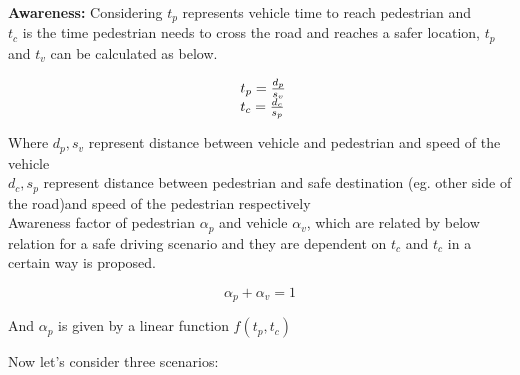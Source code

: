 
\newpara
\textbf{Awareness:}
Considering ${t_p}$ represents vehicle time to reach pedestrian and \\
${t_c}$ is the time pedestrian needs to cross the road and reaches a safer location,
${t_p}$ and ${t_v}$  can be calculated as below.

\begin{equation}
\begin{array}{l@{}}
  t_p = \frac{d_p}{s_v} \\
	t_c = \frac{d_c}{s_p}
\end{array}
\end{equation}

Where ${d_p},{s_v}$ represent distance between vehicle and pedestrian and speed of the vehicle\\
${d_c}, {s_p}$ represent distance between pedestrian and safe destination (eg. other side of the road)and speed of the pedestrian respectively \\
Awareness factor of pedestrian ${\alpha_p}$ and vehicle ${\alpha_v}$, 
which are related by below relation for a safe driving scenario and they are dependent on ${t_c}$ and ${t_c}$ in a certain way is proposed.

\comment
{
}
\begin{equation} \label{awareness_factor}
  \alpha_p + \alpha_v = 1
\end{equation}

And $\alpha_p$ is given by a linear function \cite{osaragi2004modeling} $f(t_p, t_c)$ 

Now let's consider three scenarios:

